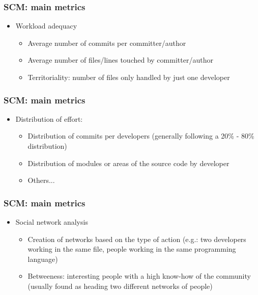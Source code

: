\documentclass{beamer}
\begin{document}
\begin{frame}
 \frametitle{SCM: main metrics}
 \begin{itemize}
 \item Workload adequacy
  \begin{itemize}
  \item Average number of commits per committer/author
  \item Average number of files/lines touched by committer/author
  \item Territoriality: number of files only handled by just one developer
  \end{itemize}
 \end{itemize}


\end{frame}



\begin{frame}
 \frametitle{SCM: main metrics}
 \begin{itemize}
 \item Distribution of effort:
  \begin{itemize}
    \item Distribution of commits per developers (generally following a 20\% - 80\% distribution)
    \item Distribution of modules or areas of the source code by developer
    \item Others...
  \end{itemize}
 \end{itemize}
\end{frame}


\begin{frame}
 \frametitle{SCM: main metrics}
 \begin{itemize}
 \item Social network analysis
  \begin{itemize}
    \item Creation of networks based on the type of action (e.g.: two developers working in the same file, people working in the same programming language)
    \item Betweeness: interesting people with a high know-how of the community (usually found as heading two different networks of people)
  \end{itemize}
 \end{itemize}
\end{frame}
\end{document}
